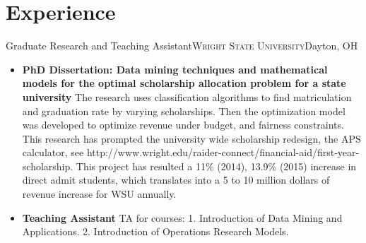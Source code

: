 \documentclass[12pt,letterpaper,roman]{moderncv} %
\begin{document}
\section{Experience}
 {Graduate Research and Teaching
Assistant}{\textsc{Wright State University}}{Dayton, OH}{}{
\begin{itemize}
\item \textbf{PhD Dissertation: Data mining techniques and mathematical models for the optimal scholarship allocation problem for a state university}
\newline
The research uses classification algorithms to find
matriculation and graduation rate by varying scholarships. Then the
optimization model was developed to optimize revenue under budget, and fairness constraints.
This research has prompted the university wide scholarship redesign, the APS
calculator, see http://www.wright.edu/raider-connect/financial-aid/first-year-scholarship.
This project has resulted a 11\% (2014), 13.9\% (2015) increase in direct admit
students, which translates into a 5 to 10 million dollars of revenue increase
for WSU annually.
\item \textbf{Teaching Assistant}
TA for courses: 1. Introduction of Data Mining and Applications. 2. Introduction of
Operations Research Models.
\end{itemize} }
\end{document}
